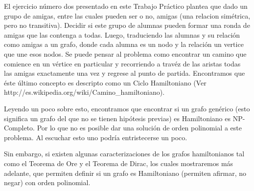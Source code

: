 El ejercicio número dos presentado en este Trabajo Práctico plantea que dado un grupo de amigas, entre las cuales pueden ser o no, amigas (una relacion simétrica, pero no transitiva). Decidir si este grupo de alumnas pueden formar una ronda de amigas que las contenga a todas. Luego, traduciendo las alumnas y su relación como amigas a un grafo, donde cada alumna es un nodo y la relación un vertice que une esos nodos. Se puede pensar al problema como encontrar un camino que comience en un vértice en particular y recorriendo a travéz de las aristas todas las amigas exactamente una vez y regrese al punto de partida. Encontramos que éste último concepto es descripto como un Ciclo Hamiltoniano (Ver http://es.wikipedia.org/wiki/Camino\_hamiltoniano).

Leyendo un poco sobre esto, encontramos que encontrar si un grafo genérico (esto significa un grafo del que no se tienen hipótesis previas) es Hamiltoniano es NP-Completo. Por lo que no es posible dar una solución de orden polinomial a este problema. Al escuchar esto uno podría entristecerse un poco.

Sin embargo, si existen algunas caracterizaciones de los grafos hamiltonianos tal como el Teorema de Ore y el Teorema de Dirac, los cuales mostraremos más adelante, que permiten definir si un grafo es Hamiltoniano (permiten afirmar, no negar) con orden polinomial.
